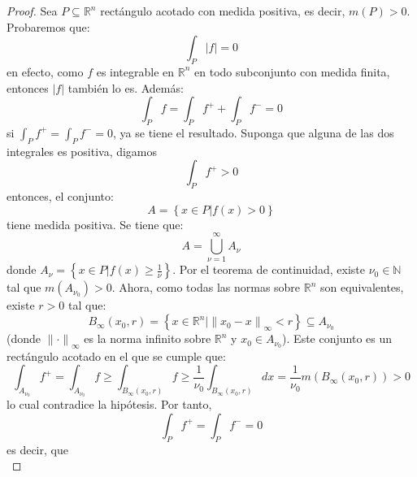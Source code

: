 \documentclass[12pt]{report}
\theoremstyle{largebreak}
\newcommand\abs[1]{\ensuremath{\big|#1\big|}}
\newcommand\norm[1]{\ensuremath{\|#1\|}}
\begin{document}
    \begin{proof}
        Sea $P\subseteq\mathbb{R}^n$ rectángulo acotado con medida positiva, es decir, $m(P)>0$. Probaremos que:
        \begin{equation*}
            \int_P\abs{f}=0
        \end{equation*}
        en efecto, como $f$ es integrable en $\mathbb{R}^n$ en todo subconjunto con medida finita, entonces $\abs{f}$ también lo es. Además:
        \begin{equation*}
            \int_P f=\int_{P}f^++\int_{P}f^-=0
        \end{equation*}
        si $\int_{P}f^+=\int_{P}f^-=0$, ya se tiene el resultado. Suponga que alguna de las dos integrales es positiva, digamos
        \begin{equation*}
            \int_{P}f^+>0
        \end{equation*}
        entonces, el conjunto:
        \begin{equation*}
            A=\left\{x\in P\Big|f(x)>0 \right\}
        \end{equation*}
        tiene medida positiva. Se tiene que:
        \begin{equation*}
            A=\bigcup_{ \nu=1}^\infty A_\nu
        \end{equation*}
        donde $A_\nu=\left\{x\in P\Big|f(x)\geq\frac{1}{\nu}\right\}$. Por el teorema de continuidad, existe $\nu_0\in\mathbb{N}$ tal que $m(A_{\nu_0})>0$. Ahora, como todas las normas sobre $\mathbb{R}^n$ son equivalentes, existe $r>0$ tal que:
        \begin{equation*}
            B_\infty(x_0,r)=\left\{x\in\mathbb{R}^n\Big|\norm{x_0-x}_{\infty}<r \right\}\subseteq A_{\nu_0}
        \end{equation*}
        (donde $\norm{\cdot}_{\infty}$ es la norma infinito sobre $\mathbb{R}^n$ y $x_0\in A_{\nu_0}$). Este conjunto es un rectángulo acotado en el que se cumple que:
        \begin{equation*}
            \int_{A_{\nu_0}} f^+=\int_{A_{\nu_0}} f\geq \int_{B_\infty(x_0,r)}f\geq \frac{1}{\nu_0}\int_{B_\infty(x_0,r)}dx=\frac{1}{\nu_0}m(B_\infty(x_0,r))>0
        \end{equation*}
        lo cual contradice la hipótesis. Por tanto,
        \begin{equation*}
            \int_{P}f^+=\int_{P}f^-=0
        \end{equation*}
        es decir, que
        \begin{equation*}

\end{equation*}
\end{proof}
\end{document}
